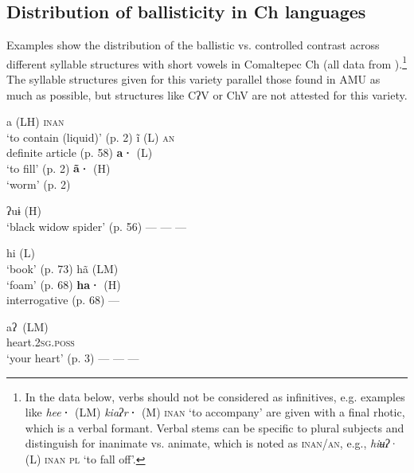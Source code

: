 \documentclass[output=paper]{langscibook}
\begin{document}
\subsection{Distribution of ballisticity in Ch languages}%

Examples  show the distribution of the ballistic vs. controlled contrast across different syllable structures with short vowels in Comaltepec Ch (all data from \citealt{AndersenEtAl2021}).\footnote{In
     the data below, verbs should not be considered as infinitives, e.g. examples like \textit{hee}\textbf{·} (LM) \textit{kiaʔr}\textbf{·} (M) \textsc{inan} ‘to accompany’ are given with a final rhotic, which is a verbal formant. Verbal stems can be specific to plural subjects and distinguish for inanimate vs. animate, which is noted as \textsc{inan/an}, e.g., \textit{hiʉʔ}{{·}} (L) \textsc{inan} \textsc{pl} ‘to fall off’.
} The syllable structures given for this variety parallel those found in AMU as much as possible, but structures like CʔV or ChV are not attested for this variety.



\ea
{}
          {a (LH) \textsc{inan} \\
               \glt ‘to contain (liquid)’ (p. 2)
          }
          {ĩ (L) \textsc{an}\\
               \glt definite article (p. 58)
          }
          {\textbf{a·} (L) \\
               \glt ‘to fill’ (p. 2)
          }
          {\textbf{ã·} (H)\\
               \glt ‘worm’ (p. 2)
          }
\z

\ea
{}
     {ʔuɨ (H)\\
          \glt ‘black widow spider’ (p. 56)
     }
     {---}
     {---}
     {---}
\z


\ea
{}
     {hi (L)\\
          \glt ‘book’ (p. 73)
     }
     {hã (LM) \\
          \glt ‘foam’ (p. 68)
     }
     {\textbf{ha·} (H)  \\
               interrogative (p. 68)
     }
     {---}
\z


\ea
{}
     {\gll aʔ~(LM) \\
          heart.2\textsc{sg.poss}\\
          \glt ‘your heart’ (p. 3)
     }
     {---}
     {---}
     {---}
\z
\end{document}
